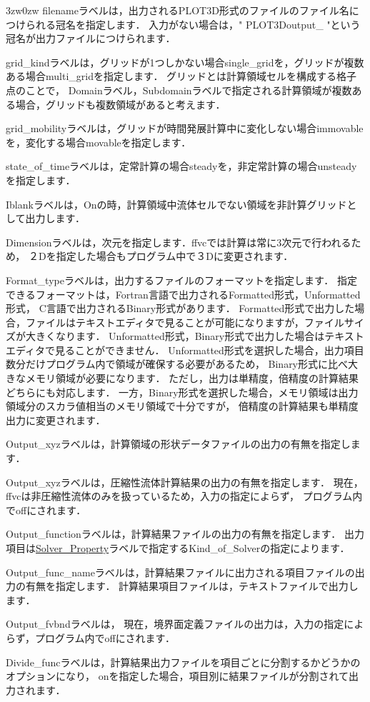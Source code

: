 \begin{indentation}{3zw}{0zw}
filenameラベルは，出力されるPLOT3D形式のファイルのファイル名につけられる冠名を指定します．
入力がない場合は，" PLOT3Doutput\_ "という冠名が出力ファイルにつけられます．

grid\_kindラベルは，グリッドが1つしかない場合single\_gridを，グリッドが複数ある場合multi\_gridを指定します．
グリッドとは計算領域セルを構成する格子点のことで，
Domainラベル，Subdomainラベルで指定される計算領域が複数ある場合，グリッドも複数領域があると考えます．

grid\_mobilityラベルは，グリッドが時間発展計算中に変化しない場合immovableを，変化する場合movableを指定します．

state\_of\_timeラベルは，定常計算の場合steadyを，非定常計算の場合unsteadyを指定します．

Iblankラベルは，Onの時，計算領域中流体セルでない領域を非計算グリッドとして出力します．

Dimensionラベルは，次元を指定します．ffvcでは計算は常に3次元で行われるため，
２Dを指定した場合もプログラム中で３Dに変更されます．

Format\_typeラベルは，出力するファイルのフォーマットを指定します．
指定できるフォーマットは，Fortran言語で出力されるFormatted形式，Unformatted形式，
C言語で出力されるBinary形式があります．
Formatted形式で出力した場合，ファイルはテキストエディタで見ることが可能になりますが，ファイルサイズが大きくなります．
Unformatted形式，Binary形式で出力した場合はテキストエディタで見ることができません．
Unformatted形式を選択した場合，出力項目数分だけプログラム内で領域が確保する必要があるため，
Binary形式に比べ大きなメモリ領域が必要になります．
ただし，出力は単精度，倍精度の計算結果どちらにも対応します．
一方，Binary形式を選択した場合，メモリ領域は出力領域分のスカラ値相当のメモリ領域で十分ですが，
倍精度の計算結果も単精度出力に変更されます．

Output\_xyzラベルは，計算領域の形状データファイルの出力の有無を指定します．

Output\_xyzラベルは，圧縮性流体計算結果の出力の有無を指定します．
現在，ffvcは非圧縮性流体のみを扱っているため，入力の指定によらず，
プログラム内でoffにされます．

Output\_functionラベルは，計算結果ファイルの出力の有無を指定します．
出力項目は\hyperlink{tgt:solver_property}{Solver\_Property}ラベルで指定するKind\_of\_Solverの指定によります．

Output\_func\_nameラベルは，計算結果ファイルに出力される項目ファイルの出力の有無を指定します．
計算結果項目ファイルは，テキストファイルで出力します．

Output\_fvbndラベルは，
現在，境界面定義ファイルの出力は，入力の指定によらず，プログラム内でoffにされます．

Divide\_funcラベルは，計算結果出力ファイルを項目ごとに分割するかどうかのオプションになり，
onを指定した場合，項目別に結果ファイルが分割されて出力されます．

\end{indentation}



